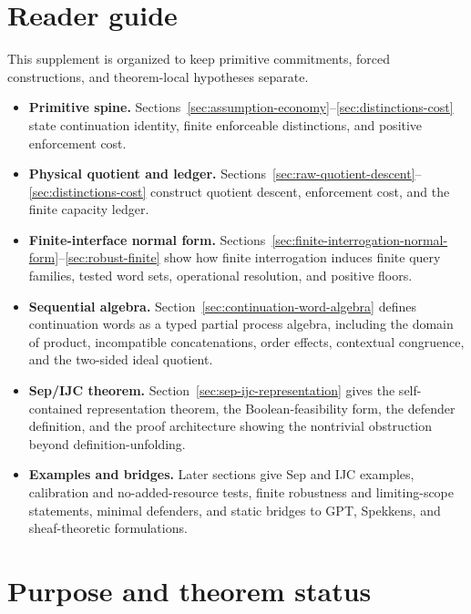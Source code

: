 \documentclass[11pt]{article}
\begin{document}
\tableofcontents
\newpage



\section*{Reader guide}

This supplement is organized to keep primitive commitments, forced constructions, and theorem-local hypotheses separate.

\begin{itemize}[leftmargin=2em]
\item \textbf{Primitive spine.}  Sections~\ref{sec:assumption-economy}--\ref{sec:distinctions-cost} state continuation identity, finite enforceable distinctions, and positive enforcement cost.
\item \textbf{Physical quotient and ledger.}  Sections~\ref{sec:raw-quotient-descent}--\ref{sec:distinctions-cost} construct quotient descent, enforcement cost, and the finite capacity ledger.
\item \textbf{Finite-interface normal form.}  Sections~\ref{sec:finite-interrogation-normal-form}--\ref{sec:robust-finite} show how finite interrogation induces finite query families, tested word sets, operational resolution, and positive floors.
\item \textbf{Sequential algebra.}  Section~\ref{sec:continuation-word-algebra} defines continuation words as a typed partial process algebra, including the domain of product, incompatible concatenations, order effects, contextual congruence, and the two-sided ideal quotient.
\item \textbf{Sep/IJC theorem.}  Section~\ref{sec:sep-ijc-representation} gives the self-contained representation theorem, the Boolean-feasibility form, the defender definition, and the proof architecture showing the nontrivial obstruction beyond definition-unfolding.
\item \textbf{Examples and bridges.}  Later sections give Sep and IJC examples, calibration and no-added-resource tests, finite robustness and limiting-scope statements, minimal defenders, and static bridges to GPT, Spekkens, and sheaf-theoretic formulations.
\end{itemize}

\section{Purpose and theorem status}\label{sec:purpose-status}
\end{document}
